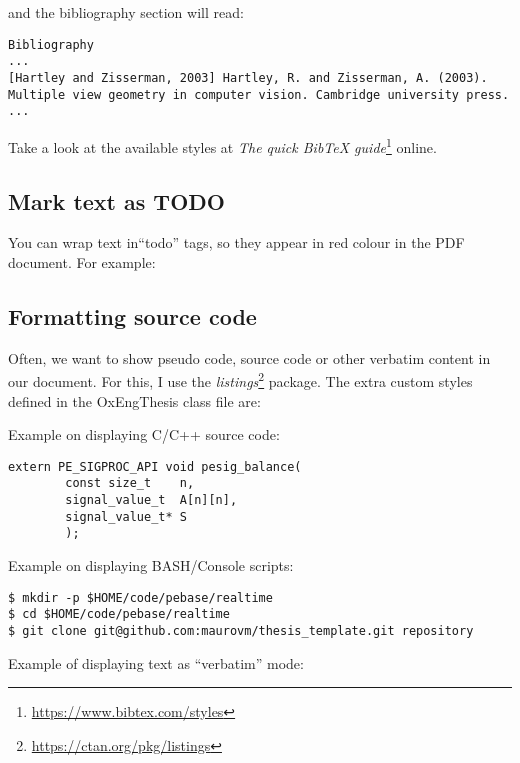 \noindent and the bibliography section will read:


\begin{lstlisting}[style=custom-text]
Bibliography
...
[Hartley and Zisserman, 2003] Hartley, R. and Zisserman, A. (2003). Multiple view geometry in computer vision. Cambridge university press.
...
\end{lstlisting}

Take a look at the available styles at \textit{The quick BibTeX guide}\footnote{\url{https://www.bibtex.com/styles}} online.


\subsection{Mark text as TODO}


You can wrap text in``todo'' tags, so they appear in red colour in the PDF document. For example:



\subsection{Formatting source code}


Often, we want to show pseudo code, source code or other verbatim content in our document. For this, I use the \textit{listings}\footnote{\url{https://ctan.org/pkg/listings}} package. The extra custom styles defined in the OxEngThesis class file are:


Example on displaying C/C++ source code:


\begin{lstlisting}[style=custom-c,caption={Function to balance a matrix.}]
extern PE_SIGPROC_API void pesig_balance(
        const size_t    n,
        signal_value_t  A[n][n],
        signal_value_t* S
        );
\end{lstlisting}


Example on displaying BASH/Console scripts:


\begin{lstlisting}[style=custom-bash,caption={A script in bash.}]
$ mkdir -p $HOME/code/pebase/realtime
$ cd $HOME/code/pebase/realtime
$ git clone git@github.com:maurovm/thesis_template.git repository
\end{lstlisting}


Example of displaying text as ``verbatim'' mode:


